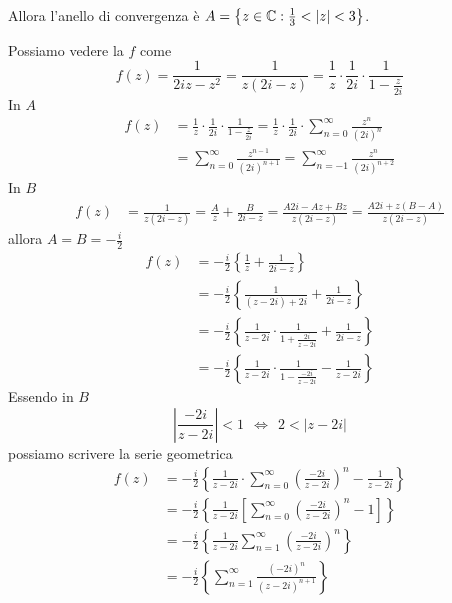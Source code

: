 Allora l'anello di convergenza è $A=\left\{z\in \mathbb{C}  :\frac{1}{3} < \left| z\right| < 3\right\}$.
\Soluzione

Possiamo vedere la $f$ come
\begin{equation*}
f\left( z\right) =\frac{1}{2iz-z^{2}} =\frac{1}{z\left( 2i-z\right)} =\frac{1}{z} \cdotp \frac{1}{2i} \cdotp \frac{1}{1-\frac{z}{2i}}
\end{equation*}
In $A$
\begin{align*}
f\left( z\right) & =\frac{1}{z} \cdotp \frac{1}{2i} \cdotp \frac{1}{1-\frac{z}{2i}} =\frac{1}{z} \cdotp \frac{1}{2i} \cdotp \sum\limits ^{\infty }_{n=0}\frac{z^{n}}{\left( 2i\right)^{n}}\\
 & =\sum\limits ^{\infty }_{n=0}\frac{z^{n-1}}{\left( 2i\right)^{n+1}} =\sum\limits ^{\infty }_{n=-1}\frac{z^{n}}{\left( 2i\right)^{n+2}}
\end{align*}
In $B$
\begin{align*}
f\left( z\right) & =\frac{1}{z\left( 2i-z\right)} =\frac{A}{z} +\frac{B}{2i-z} =\frac{A2i-Az+Bz}{z\left( 2i-z\right)} =\frac{A2i+z\left( B-A\right)}{z\left( 2i-z\right)}
\end{align*}
allora $A=B=-\frac{i}{2}$
\begin{align*}
f\left( z\right) & =-\frac{i}{2}\left\{\frac{1}{z} +\frac{1}{2i-z}\right\}\\
 & =-\frac{i}{2}\left\{\frac{1}{\left( z-2i\right) +2i} +\frac{1}{2i-z}\right\}\\
 & =-\frac{i}{2}\left\{\frac{1}{z-2i} \cdotp \frac{1}{1+\frac{2i}{z-2i}} +\frac{1}{2i-z}\right\}\\
 & =-\frac{i}{2}\left\{\frac{1}{z-2i} \cdotp \frac{1}{1-\frac{-2i}{z-2i}} -\frac{1}{z-2i}\right\}
\end{align*}
Essendo in $B$
\begin{equation*}
\left| \frac{-2i}{z-2i}\right| < 1\ \ \iff \ \ 2< \left| z-2i\right| 
\end{equation*}
possiamo scrivere la serie geometrica
\begin{align*}
f\left( z\right) & =-\frac{i}{2}\left\{\frac{1}{z-2i} \cdotp \sum\limits ^{\infty }_{n=0}\left(\frac{-2i}{z-2i}\right)^{n} -\frac{1}{z-2i}\right\}\\
 & =-\frac{i}{2}\left\{\frac{1}{z-2i}\left[\sum\limits ^{\infty }_{n=0}\left(\frac{-2i}{z-2i}\right)^{n} -1\right]\right\}\\
 & =-\frac{i}{2}\left\{\frac{1}{z-2i}\sum\limits ^{\infty }_{n=1}\left(\frac{-2i}{z-2i}\right)^{n}\right\}\\
 & =-\frac{i}{2}\left\{\sum\limits ^{\infty }_{n=1}\frac{\left( -2i\right)^{n}}{\left( z-2i\right)^{n+1}}\right\}
\end{align*}
